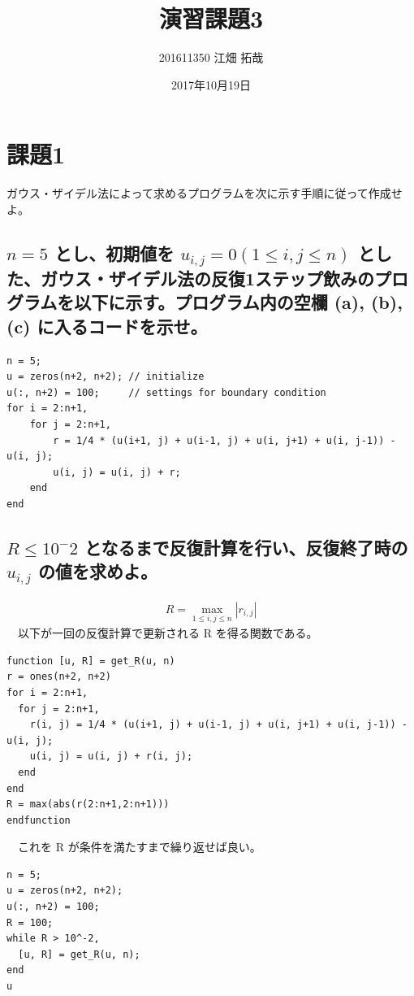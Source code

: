 \documentclass[a4j, 11pt]{jarticle}
\author{201611350 江畑 拓哉}
\date{2017年10月19日}
\title{演習課題3}
\begin{document}
\section{課題1}
\label{sec:org4f62ef8}
ガウス・ザイデル法によって求めるプログラムを次に示す手順に従って作成せよ。\\
\subsection{\(n = 5\) とし、初期値を \(u_{i, j} = 0(1 \leq i, j \leq n)\) とした、ガウス・ザイデル法の反復1ステップ飲みのプログラムを以下に示す。プログラム内の空欄 (a), (b), (c) に入るコードを示せ。}
\label{sec:org2f627ef}
\begin{verbatim}
n = 5;
u = zeros(n+2, n+2); // initialize
u(:, n+2) = 100;     // settings for boundary condition
for i = 2:n+1,
    for j = 2:n+1,
        r = 1/4 * (u(i+1, j) + u(i-1, j) + u(i, j+1) + u(i, j-1)) - u(i, j);
        u(i, j) = u(i, j) + r;
    end
end
\end{verbatim}
\subsection{\(R\leq 10^-2\) となるまで反復計算を行い、反復終了時の \(u_{i, j}\) の値を求めよ。}
\label{sec:org259d515}
\begin{eqnarray*}
R = \max_{1 \leq i, j \leq n} |r_{i, j}|
\end{eqnarray*}
　以下が一回の反復計算で更新される R を得る関数である。\\
\begin{verbatim}
function [u, R] = get_R(u, n)
r = ones(n+2, n+2)
for i = 2:n+1,
  for j = 2:n+1,
    r(i, j) = 1/4 * (u(i+1, j) + u(i-1, j) + u(i, j+1) + u(i, j-1)) - u(i, j);
    u(i, j) = u(i, j) + r(i, j);
  end
end
R = max(abs(r(2:n+1,2:n+1)))
endfunction
\end{verbatim}
　これを R が条件を満たすまで繰り返せば良い。\\
\begin{verbatim}
n = 5;
u = zeros(n+2, n+2);
u(:, n+2) = 100;
R = 100;
while R > 10^-2,
  [u, R] = get_R(u, n);
end
u
\end{verbatim}
\end{document}
